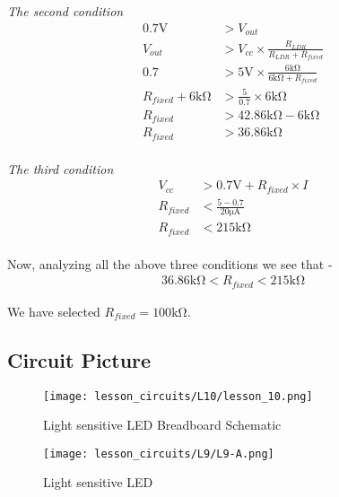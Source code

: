 \emph{The second condition}
\begin{align*}
    0.7\si{\V} & > V_{out} \\
    V_{out} & > V_{cc} \times \frac{R_{LDR}}{R_{LDR} + R_{fixed}} \\
    0.7 & > 5\si{\V} \times \frac{6\si{\kohm}}{6\si{\kohm} + R_{fixed}} \\
    R_{fixed} + 6\si{\kohm} & > \frac{5}{0.7} \times 6\si{\kohm} \\
    R_{fixed} & > 42.86\si{\kohm} - 6\si{\kohm} \\
    R_{fixed} & > 36.86\si{\kohm} \\
\end{align*}

\emph{The third condition}
\begin{align*}
    V_{cc} & > 0.7\si{\V} + R_{fixed} \times I \\
    R_{fixed} & < \frac{5 - 0.7}{20\si{\uA}} \\
    R_{fixed} & < 215\si{\kohm} \\
\end{align*}

Now, analyzing all the above three conditions we see that - 
\begin{align*}
    36.86\si{\kohm} < R_{fixed} < 215\si{\kohm}
\end{align*}

We have selected $R_{fixed} = 100\si{\kohm}$.

\subsection{Circuit Picture}
\begin{figure}[!h]
    \centering
    \texttt{[image: lesson\_circuits/L10/lesson\_10.png]}
    \caption{Light sensitive LED Breadboard Schematic}
    \label{fig:light_sense_bjt_sch}
\end{figure}
\begin{figure}[!h]
    \centering
    \texttt{[image: lesson\_circuits/L9/L9-A.png]}
    \caption{Light sensitive LED}
    \label{fig:ldr_bjt_working_obb}
\end{figure}